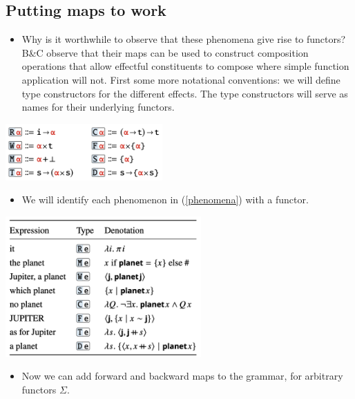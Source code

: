 \documentclass{article}
\begin{document}
\subsection{Putting maps to work}

\begin{itemize}
  \item Why is it worthwhile to observe that these phenomena give rise to functors?
    B\&C observe that their maps can be used to construct composition operations that allow effectful constituents to compose where simple
    function application will not. First some more notational conventions: we will define type constructors for the different effects.
    The type constructors will serve as names for their underlying functors.
\end{itemize}

\begin{center}
\includegraphics[width=6cm]{clips/7.png}
\end{center}

\begin{itemize}
  \item We will identify each phenomenon in (\ref{phenomena}) with a functor.
\end{itemize}

\begin{center}
\includegraphics[width=7.5cm]{clips/6.png}
\end{center}

\begin{itemize}
  \item Now we can add forward and backward maps to the grammar, for arbitrary functors $\Sigma$.
\end{itemize}
\end{document}
